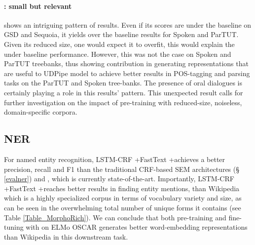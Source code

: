 \paragraph{\ELMocbt: small but relevant}
\ELMocbt shows an intriguing pattern of results. Even if its scores are under the baseline on GSD and Sequoia, it yields over the baseline results for Spoken and ParTUT.
Given its reduced size, one would expect it to overfit, this would explain the under baseline performance. However, this was not the case on Spoken and ParTUT treebanks, thus showing \ELMocbt contribution in generating representations that are useful to UDPipe model to achieve better results in POS-tagging and parsing tasks on the ParTUT and Spoken tree-banks. The presence of oral dialogues is certainly playing a role in this results' pattern.
This unexpected result calls for further investigation on the impact of pre-training with reduced-size, noiseless, domain-specific corpora.


\subsection{NER} \label{sect:ResultsNER}

For named entity recognition, LSTM-CRF +FastText +\ELMocabercar achieves a better precision, recall and F1 than the traditional CRF-based SEM architectures (§ \ref{evalner}) and \camembert, which is currently state-of-the-art.%
Importantly, LSTM-CRF +FastText +\ELMocaber reaches better results in finding entity mentions, than Wikipedia which is a highly specialized corpus in terms of vocabulary variety and size, as can be seen in the overwhelming total number of unique forms it contains (see Table \ref{Table_MorphoRich}). We can conclude that both pre-training and fine-tuning with \Cabernet on ELMo OSCAR generates better word-embedding representations than Wikipedia in this downstream task.


